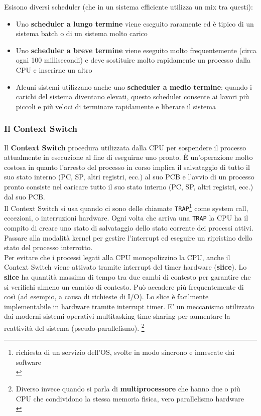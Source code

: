 \documentclass{article}
\begin{document}
Esisono diversi scheduler (che in un sistema efficiente utilizza un mix tra questi):
\begin{itemize}
    \item Uno \textbf{scheduler a lungo termine} viene eseguito raramente ed è tipico di un sistema batch o di un sistema molto carico
    \item Uno \textbf{scheduler a breve termine} viene eseguito molto frequentemente (circa ogni 100 millisecondi) e deve sostituire molto rapidamente un processo dalla CPU e inserirne un altro
    \item Alcuni sistemi utilizzano anche uno \textbf{scheduler a medio termine}: quando i carichi del sistema diventano elevati, questo scheduler consente ai lavori più piccoli e più veloci di terminare rapidamente e liberare il sistema
\end{itemize}

\subsubsection{Il Context Switch}
Il \textbf{Context Switch} procedura utilizzata dalla CPU per sospendere il processo attualmente in esecuzione al fine di eseguirne uno pronto. È un'operazione molto costosa in quanto l'arresto del processo in corso implica il salvataggio di tutto il suo stato interno (PC, SP, altri registri, ecc.) al suo PCB e l'avvio di un processo pronto consiste nel caricare tutto il suo stato interno (PC, SP, altri registri, ecc.) dal suo PCB. \\
Il Context Switch si usa quando ci sono delle chiamate \texttt{TRAP}\footnote{richiesta di un servizio dell'OS, svolte in modo sincrono e innescate dai software\\} come system call, eccezioni, o interruzioni hardware. Ogni volta che arriva una \texttt{TRAP} la CPU ha il compito di creare uno stato di salvataggio dello stato corrente dei processi attivi. Passare alla modalità kernel per gestire l'interrupt ed eseguire un ripristino dello stato del processo interrotto. \\
Per evitare che i processi legati alla CPU monopolizzino la CPU, anche il Context Switch viene attivato tramite interrupt del timer hardware (\textbf{slice}).
Lo \textbf{slice} ha quantità massima di tempo tra due cambi di contesto per garantire che si verifichi almeno un cambio di contesto. Può accadere più frequentemente di così (ad esempio, a causa di richieste di I/O). Lo slice è facilmente implementabile in hardware tramite interrupt timer. E' un meccanismo utilizzato dai moderni sistemi operativi multitasking time-sharing per aumentare la reattività del sistema (pseudo-parallelismo). \footnote{Diverso invece quando si parla di \textbf{multiprocessore} che hanno due o più CPU che condividono la stessa memoria fisica, vero parallelismo hardware\\} \\
\end{document}
